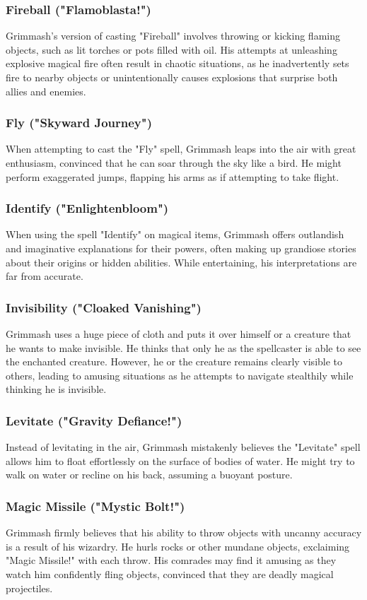 \documentclass[letterpaper,openany,oneside,twocolumn]{book}
\begin{document}
\subsubsection*{Fireball ("Flamoblasta!")}
Grimmash's version of casting "Fireball" involves throwing or kicking flaming objects, such as lit torches or pots filled with oil. His attempts at unleashing explosive magical fire often result in chaotic situations, as he inadvertently sets fire to nearby objects or unintentionally causes explosions that surprise both allies and enemies.
\subsubsection*{Fly ("Skyward Journey")}
When attempting to cast the "Fly" spell, Grimmash leaps into the air with great enthusiasm, convinced that he can soar through the sky like a bird. He might perform exaggerated jumps, flapping his arms as if attempting to take flight.
\subsubsection*{Identify ("Enlightenbloom")}
When using the spell "Identify" on magical items, Grimmash offers outlandish and imaginative explanations for their powers, often making up grandiose stories about their origins or hidden abilities. While entertaining, his interpretations are far from accurate.
\subsubsection*{Invisibility ("Cloaked Vanishing")}
Grimmash uses a huge piece of cloth and puts it over himself or a creature that he wants to make invisible. He thinks that only he as the spellcaster is able to see the enchanted creature. However, he or the creature remains clearly visible to others, leading to amusing situations as he attempts to navigate stealthily while thinking he is invisible.
\subsubsection*{Levitate ("Gravity Defiance!")}
Instead of levitating in the air, Grimmash mistakenly believes the "Levitate" spell allows him to float effortlessly on the surface of bodies of water. He might try to walk on water or recline on his back, assuming a buoyant posture.
\subsubsection*{Magic Missile ("Mystic Bolt!")}
Grimmash firmly believes that his ability to throw objects with uncanny accuracy is a result of his wizardry. He hurls rocks or other mundane objects, exclaiming "Magic Missile!" with each throw. His comrades may find it amusing as they watch him confidently fling objects, convinced that they are deadly magical projectiles.
\end{document}
